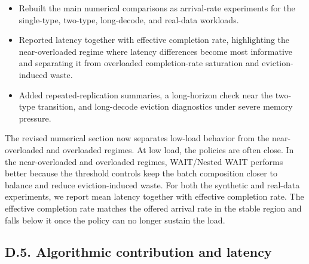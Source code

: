 \changes
\begin{itemize}
    \item Rebuilt the main numerical comparisons as arrival-rate experiments for the single-type, two-type, long-decode, and real-data workloads.
    \item Reported latency together with effective completion rate, highlighting the near-overloaded regime where latency differences become most informative and separating it from overloaded completion-rate saturation and eviction-induced waste.
    \item Added repeated-replication summaries, a long-horizon check near the two-type transition, and long-decode eviction diagnostics under severe memory pressure.
\end{itemize}

\vspace{0.25em}
\noindent The revised numerical section now separates low-load behavior from the near-overloaded and overloaded regimes. At low load, the policies are often close. In the near-overloaded and overloaded regimes, WAIT/Nested WAIT performs better because the threshold controls keep the batch composition closer to balance and reduce eviction-induced waste. For both the synthetic and real-data experiments, we report mean latency together with effective completion rate. The effective completion rate matches the offered arrival rate in the stable region and falls below it once the policy can no longer sustain the load.

\subsection*{D.5. Algorithmic contribution and latency}


